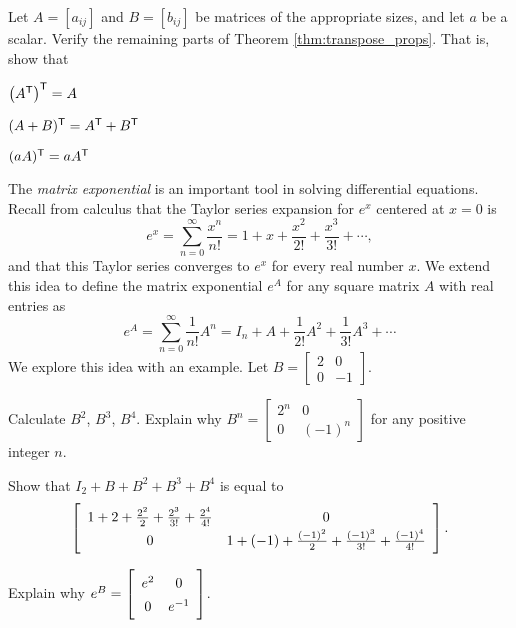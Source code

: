 \item Let $A = [a_{ij}]$ and $B = [b_{ij}]$ be matrices of the appropriate sizes, and let $a$ be a scalar. Verify the remaining parts of Theorem \ref{thm:transpose_props}. That is, show that
	\ba
	\item $\left(A^{\mathsf{T}}\right)^{\mathsf{T}} = A$
	\item $(A+B)^{\mathsf{T}} = A^{\mathsf{T}} + B^{\mathsf{T}}$
	\item $(aA)^{\mathsf{T}} = aA^{\mathsf{T}}$
	\ea

\item \label{ex:2_a_matrix_exponential} The \emph{matrix exponential} is an important tool in solving differential equations. Recall from calculus that the Taylor series expansion for $e^x$ centered at $x=0$ is 
\begin{equation*} %
e^x = \sum_{n=0}^{\infty} \frac{x^n}{n!} = 1 + x + \frac{x^2}{2!} + \frac{x^3}{3!} + \cdots,
\end{equation*}
and that this Taylor series converges to $e^x$ for every real number $x$. We extend this idea to define the matrix exponential $e^A$ for any square matrix $A$ with real entries as 
\[e^A = \sum_{n=0}^{\infty} \frac{1}{n!}A^n = I_n + A + \frac{1}{2!}A^2 + \frac{1}{3!}A^3 + \cdots\]
We explore this idea with an example.  Let $B = \left[ \begin{array}{cr} 2&0\\0&-1 \end{array} \right]$. 
	\ba
	\item Calculate $B^2$, $B^3$, $B^4$. Explain why $B^n = \left[ \begin{array}{cc} 2^n&0\\0&(-1)^n \end{array} \right]$ for any positive integer $n$. 

	\item Show that  $I_2 + B + B^2 + B^3 + B^4$ is equal to 
	\[\left[\renewcommand{\arraystretch}{1.4} \begin{array}{cc} 1+2+\frac{2^2}{2} + \frac{2^3}{3!} + \frac{2^4}{4!}&0\\0&1+(-1)+\frac{(-1)^2}{2} + \frac{(-1)^3}{3!} + \frac{(-1)^4}{4!} \end{array} \right].\]

	\item Explain why $e^B = \left[\renewcommand{\arraystretch}{1.4} \begin{array}{cc} e^2&0\\0&e^{-1} \end{array} \right]$.

